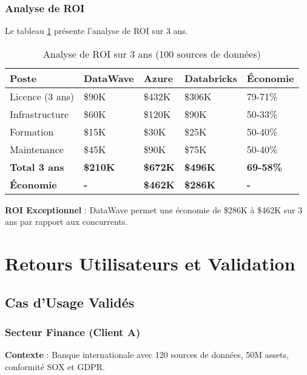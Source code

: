 \subsubsection{Analyse de ROI}

Le tableau \ref{tab:analyse_roi} présente l'analyse de ROI sur 3 ans.

\begin{table}[htpb]
\centering
\caption{Analyse de ROI sur 3 ans (100 sources de données)}
\label{tab:analyse_roi}
\begin{tabular}{|p{}|p{}|p{}|p{}|p{}|}
\hline
\textbf{Poste} & \textbf{DataWave} & \textbf{Azure} & \textbf{Databricks} & \textbf{Économie} \\
\hline
Licence (3 ans) & \$90K & \$432K & \$306K & 79-71\% \\
\hline
Infrastructure & \$60K & \$120K & \$90K & 50-33\% \\
\hline
Formation & \$15K & \$30K & \$25K & 50-40\% \\
\hline
Maintenance & \$45K & \$90K & \$75K & 50-40\% \\
\hline
\textbf{Total 3 ans} & \textbf{\$210K} & \textbf{\$672K} & \textbf{\$496K} & \textbf{69-58\%} \\
\hline
\textbf{Économie} & \textbf{-} & \textbf{\$462K} & \textbf{\$286K} & \textbf{-} \\
\hline
\end{tabular}
\end{table}

\textbf{ROI Exceptionnel} : DataWave permet une économie de \$286K à \$462K sur 3 ans par rapport aux concurrents.

\section{Retours Utilisateurs et Validation}

\subsection{Cas d'Usage Validés}

\subsubsection{Secteur Finance (Client A)}

\textbf{Contexte} : Banque internationale avec 120 sources de données, 50M assets, conformité SOX et GDPR.

